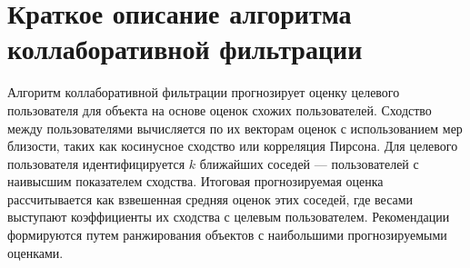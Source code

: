 \chapter{Краткое описание алгоритма коллаборативной фильтрации}

Алгоритм коллаборативной фильтрации прогнозирует оценку целевого пользователя для объекта на основе оценок схожих пользователей. Сходство между пользователями вычисляется по их векторам оценок с использованием мер близости, таких как косинусное сходство или корреляция Пирсона. Для целевого пользователя идентифицируется $k$ ближайших соседей --- пользователей с наивысшим показателем сходства. Итоговая прогнозируемая оценка рассчитывается как взвешенная средняя оценок этих соседей, где весами выступают коэффициенты их сходства с целевым пользователем. Рекомендации формируются путем ранжирования объектов с наибольшими прогнозируемыми оценками.

\clearpage
